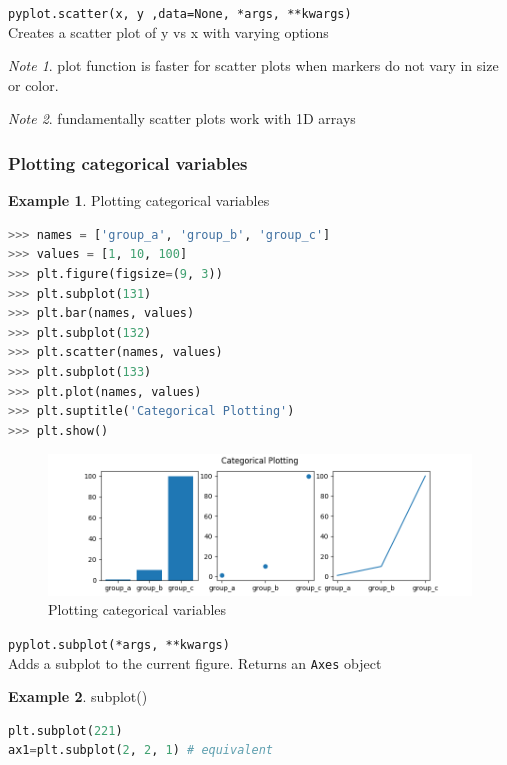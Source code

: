 \documentclass{article}
\theoremstyle{definition}
\newtheorem{ex}{Example}[subsection]
\theoremstyle{remark}
\newtheorem*{nb}{Note}
\newcommand{\func}[2]{\noindent\lstinline{#1}\\#2}
\begin{document}
\func{pyplot.scatter(x, y ,data=None, *args, **kwargs)}{Creates a scatter plot of y vs x with varying options}

\begin{nb}
plot function is faster for scatter plots when markers do not vary in size or color.
\end{nb}

\begin{nb}
fundamentally scatter plots work with 1D arrays
\end{nb}
\subsubsection{Plotting categorical variables}

\begin{ex}Plotting categorical variables
\begin{lstlisting}[language=Python]
>>> names = ['group_a', 'group_b', 'group_c']
>>> values = [1, 10, 100]
>>> plt.figure(figsize=(9, 3))
>>> plt.subplot(131)
>>> plt.bar(names, values)
>>> plt.subplot(132)
>>> plt.scatter(names, values)
>>> plt.subplot(133)
>>> plt.plot(names, values)
>>> plt.suptitle('Categorical Plotting')
>>> plt.show()
\end{lstlisting}

\begin{figure}[h]
    \centering
    \includegraphics[width=\textwidth]{matplotlib_cat_vars}
    \caption{Plotting categorical variables}
    \label{fig:mpl_cat_vars}
\end{figure}
\end{ex}


\func{pyplot.subplot(*args, **kwargs)}{Adds a subplot to the current figure. Returns an \lstinline{Axes} object}


\begin{ex} subplot()
\begin{lstlisting}[language=Python]
plt.subplot(221)
ax1=plt.subplot(2, 2, 1) # equivalent
\end{lstlisting}
\end{ex}
\end{document}
